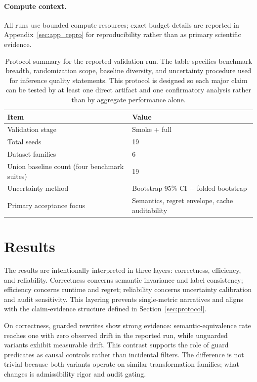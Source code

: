 \documentclass{article} %
\begin{document}
\paragraph{Compute context.}
All runs use bounded compute resources; exact budget details are reported in Appendix~\ref{sec:app_repro} for reproducibility rather than as primary scientific evidence.

\begin{table}[t]
\caption{Protocol summary for the reported validation run. The table specifies benchmark breadth, randomization scope, baseline diversity, and uncertainty procedure used for inference quality statements. This protocol is designed so each major claim can be tested by at least one direct artifact and one confirmatory analysis rather than by aggregate performance alone.}
\label{tab:protocol}
\begin{center}
\small
\renewcommand{\arraystretch}{1.1}
\setlength{\tabcolsep}{4pt}
\begin{tabular}{ll}
\hline
Item & Value \\
\hline
Validation stage & Smoke + full \\
Total seeds & 19 \\
Dataset families & 6 \\
Union baseline count (four benchmark suites) & 19 \\
Uncertainty method & Bootstrap 95\% CI + folded bootstrap \\
Primary acceptance focus & Semantics, regret envelope, cache auditability \\
\hline
\end{tabular}
\end{center}
\end{table}

\section{Results}
\label{sec:results}
The results are intentionally interpreted in three layers: correctness, efficiency, and reliability. Correctness concerns semantic invariance and label consistency; efficiency concerns runtime and regret; reliability concerns uncertainty calibration and audit sensitivity. This layering prevents single-metric narratives and aligns with the claim-evidence structure defined in Section~\ref{sec:protocol}.

On correctness, guarded rewrites show strong evidence: semantic-equivalence rate reaches one with zero observed drift in the reported run, while unguarded variants exhibit measurable drift. This contrast supports the role of guard predicates as causal controls rather than incidental filters. The difference is not trivial because both variants operate on similar transformation families; what changes is admissibility rigor and audit gating.
\end{document}
